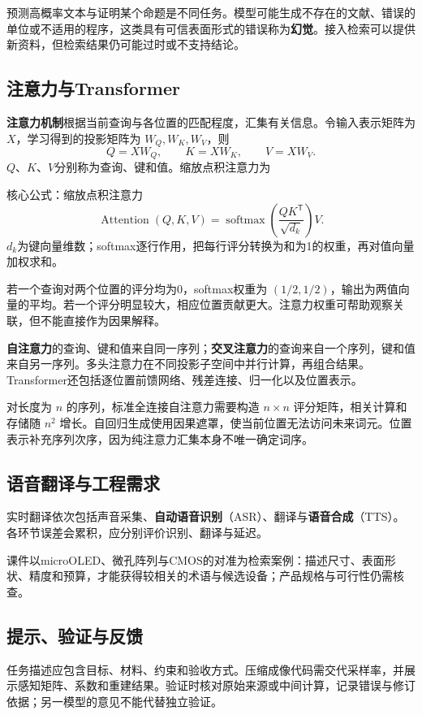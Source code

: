 \documentclass[UTF8,fontset=none,zihao=-4,a4paper]{ctexart}
\newcommand{\term}[1]{\textbf{#1}}
\DeclareMathOperator{\softmax}{softmax}
\begin{document}
预测高概率文本与证明某个命题是不同任务。模型可能生成不存在的文献、错误的单位或不适用的程序，这类具有可信表面形式的错误称为\term{幻觉}。接入检索可以提供新资料，但检索结果仍可能过时或不支持结论。

\subsection{注意力与Transformer}
\term{注意力机制}根据当前查询与各位置的匹配程度，汇集有关信息。令输入表示矩阵为 $X$，学习得到的投影矩阵为 $W_Q,W_K,W_V$，则
\[
Q=XW_Q,\qquad K=XW_K,\qquad V=XW_V.
\]
$Q$、$K$、$V$分别称为查询、键和值。缩放点积注意力为
\begin{infobox}{核心公式：缩放点积注意力}
\[
\operatorname{Attention}(Q,K,V)=\softmax\!\left(\frac{QK^{\mathsf T}}{\sqrt{d_k}}\right)V.
\]
$d_k$为键向量维数；softmax逐行作用，把每行评分转换为和为1的权重，再对值向量加权求和。
\end{infobox}
若一个查询对两个位置的评分均为0，softmax权重为 $(1/2,1/2)$，输出为两值向量的平均。若一个评分明显较大，相应位置贡献更大。注意力权重可帮助观察关联，但不能直接作为因果解释。

\term{自注意力}的查询、键和值来自同一序列；\term{交叉注意力}的查询来自一个序列，键和值来自另一序列。多头注意力在不同投影子空间中并行计算，再组合结果。Transformer还包括逐位置前馈网络、残差连接、归一化以及位置表示。

对长度为 $n$ 的序列，标准全连接自注意力需要构造 $n\times n$ 评分矩阵，相关计算和存储随 $n^2$ 增长。自回归生成使用因果遮罩，使当前位置无法访问未来词元。位置表示补充序列次序，因为纯注意力汇集本身不唯一确定词序。

\subsection{语音翻译与工程需求}
实时翻译依次包括声音采集、\term{自动语音识别}（ASR）、翻译与\term{语音合成}（TTS）。各环节误差会累积，应分别评价识别、翻译与延迟。

课件以microOLED、微孔阵列与CMOS的对准为检索案例：描述尺寸、表面形状、精度和预算，才能获得较相关的术语与候选设备；产品规格与可行性仍需核查。

\subsection{提示、验证与反馈}
任务描述应包含目标、材料、约束和验收方式。压缩成像代码需交代采样率，并展示感知矩阵、系数和重建结果。验证时核对原始来源或中间计算，记录错误与修订依据；另一模型的意见不能代替独立验证。
\end{document}
